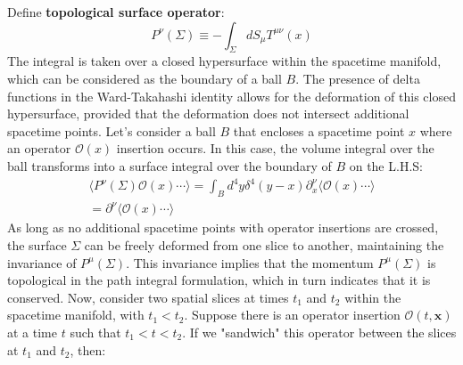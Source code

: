 \documentclass[12pt]{article}
\numberwithin{equation}{section}
\newcommand\<\langle
\renewcommand\>\rangle
\renewcommand\.{\cdot}
\begin{document}
Define \textbf{topological surface operator}:
\begin{equation}
    P^{\nu}(\Sigma)\equiv-\int_{\Sigma}{dS_{\mu}}T^{\mu\nu}(x)
\end{equation}
The integral is taken over a closed hypersurface within the spacetime manifold, which can be considered as the boundary of a ball $B$. The presence of delta functions in the Ward-Takahashi identity allows for the deformation of this closed hypersurface, provided that the deformation does not intersect additional spacetime points. Let's consider a ball $B$ that encloses a spacetime point $x$ where an operator $\mathcal{O}(x)$ insertion occurs. In this case, the volume integral over the ball transforms into a surface integral over the boundary of $B$ on the L.H.S:
\begin{equation}
\begin{split}
    \langle P^{\nu}(\Sigma)\mathcal{O}(x)\cdots\rangle = \int_{B}{d^4y\delta^4(y-x)}\partial^{\nu}_{x}\langle\mathcal{O}(x)\cdots\rangle\\
    =\partial^{\nu}\langle\mathcal{O}(x)\cdots\rangle
\end{split}
\end{equation}
\indent As long as no additional spacetime points with operator insertions are crossed, the surface \( \Sigma \) can be freely deformed from one slice to another, maintaining the invariance of \( P^{\mu}(\Sigma) \). This invariance implies that the momentum \( P^{\mu}(\Sigma) \) is topological in the path integral formulation, which in turn indicates that it is conserved.
Now, consider two spatial slices at times \( t_1 \) and \( t_2 \) within the spacetime manifold, with \( t_1 < t_2 \). Suppose there is an operator insertion \( \mathcal{O}(t, \mathbf{x}) \) at a time \( t \) such that \( t_1 < t < t_2 \). If we "sandwich" this operator between the slices at \( t_1 \) and \( t_2 \), then:
\end{document}
